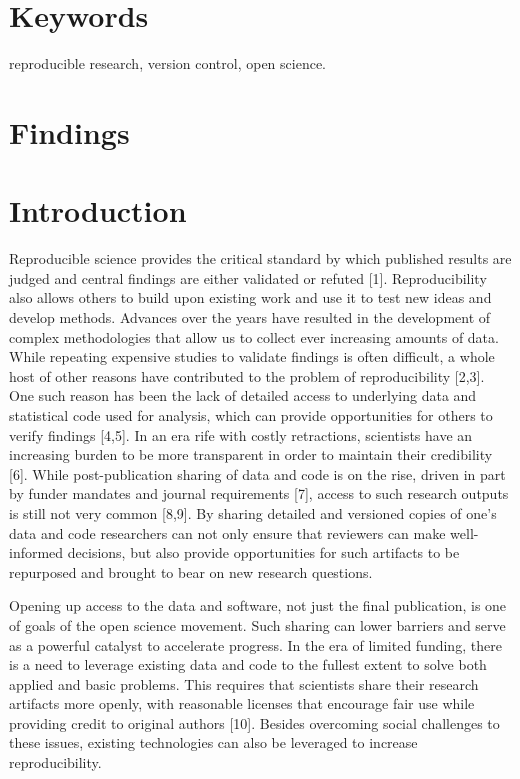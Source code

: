\documentclass[]{article}
\begin{document}
\section{Keywords}

reproducible research, version control, open science.
\newpage
\section{Findings}

\section{Introduction}

Reproducible science provides the critical standard by which published
results are judged and central findings are either validated or refuted
{[}1{]}. Reproducibility also allows others to build upon existing work
and use it to test new ideas and develop methods. Advances over the
years have resulted in the development of complex methodologies that
allow us to collect ever increasing amounts of data. While repeating
expensive studies to validate findings is often difficult, a whole host
of other reasons have contributed to the problem of reproducibility
{[}2,3{]}. One such reason has been the lack of detailed access to
underlying data and statistical code used for analysis, which can
provide opportunities for others to verify findings {[}4,5{]}. In an era
rife with costly retractions, scientists have an increasing burden to be
more transparent in order to maintain their credibility {[}6{]}. While
post-publication sharing of data and code is on the rise, driven in part
by funder mandates and journal requirements {[}7{]}, access to such
research outputs is still not very common {[}8,9{]}. By sharing detailed
and versioned copies of one's data and code researchers can not only
ensure that reviewers can make well-informed decisions, but also provide
opportunities for such artifacts to be repurposed and brought to bear on
new research questions.

Opening up access to the data and software, not just the final
publication, is one of goals of the open science movement. Such sharing
can lower barriers and serve as a powerful catalyst to accelerate
progress. In the era of limited funding, there is a need to leverage
existing data and code to the fullest extent to solve both applied and
basic problems. This requires that scientists share their research
artifacts more openly, with reasonable licenses that encourage fair use
while providing credit to original authors {[}10{]}. Besides overcoming
social challenges to these issues, existing technologies can also be
leveraged to increase reproducibility.
\end{document}
